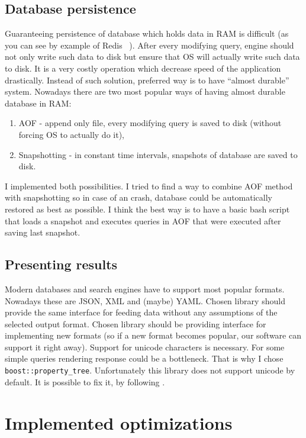 \documentclass[10pt,a4paper]{article}
\begin{document}
\subsection{Database persistence}
Guaranteeing persistence of database which holds data in RAM is difficult (as you can see by example of Redis ~\cite{REDPE}). After every modifying query, engine should not only write such data to disk but ensure that OS will actually write such data to disk. It is a very costly operation which decrease speed of the application drastically. Instead of such solution, preferred way is to have “almost durable” system.
Nowadays there are two most popular ways of having almost durable database in RAM:

\begin{enumerate}
\item AOF - append only file, every modifying query is saved to disk (without forcing OS to actually do it),
\item Snapshotting - in constant time intervals, snapshots of database are saved to disk.
\end{enumerate}
I implemented both possibilities. I tried to find a way to combine AOF method with snapshotting so in case of an crash, database could be automatically restored as best as possible. I think the best way is to have a basic bash script that loads a snapshot and executes queries in AOF that were executed after saving last snapshot.

\subsection{Presenting results}
Modern databases and search engines have to support most popular formats. Nowadays these are
JSON, XML and (maybe) YAML. Chosen library should provide the same interface for feeding data without any assumptions of the selected output format. Chosen library should be providing interface for implementing new formats (so if a new format becomes popular, our software can support it right away). Support for unicode characters is necessary. For some simple queries rendering response could be a bottleneck. That is why I chose \verb|boost::property_tree|. 
Unfortunately this library does not support unicode by default. It is possible to fix it, by following \cite{SOANS} .

\section{Implemented optimizations}
\end{document}
